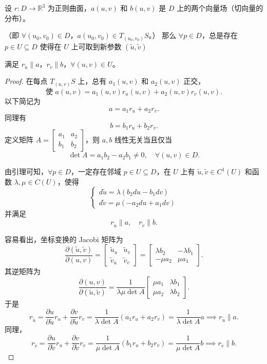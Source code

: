 \documentclass[lang=cn,10pt,thmcnt=section]{elegantbook}
\begin{document}
\begin{lemma}
    设 $r: D \rightarrow \mathbb{R}^3$ 为正则曲面，\(a(u,v)\) 和 \(b(u,v)\) 是 \(D\) 上的两个向量场（切向量的分布）。

（即 \(\forall (u_0,v_0) \in D\)，\(a(u_0,v_0) \in T_{(u_0,v_0)}S\)。）
那么 \(\forall p \in D\)，总是存在 \(p \in U \subseteq D\) 使得在 \(U\) 上可取到新参数 \((\widetilde{u}, \widetilde{v})\) 

满足 \(r_{\widetilde{u}} \parallel a\)，\(r_{\widetilde{v}} \parallel b\)，\(\forall (u,v) \in U\)。
\end{lemma}

\begin{proof}
    在每点 \( T_{(u,v)}S \) 上，总有 \( a_1(u,v) \) 和 \( a_2(u,v) \) 正交，
\[
\text{使 } a(u,v) = a_1(u,v) r_u(u,v) + a_2(u,v) r_v(u,v).
\]
以下简记为
\[
a = a_1 r_u + a_2 r_v.
\]
同理有
\[
b = b_1 r_u + b_2 r_v.
\]
定义矩阵 \( A = \begin{bmatrix} a_1 & a_2 \\ b_1 & b_2 \end{bmatrix} \)，则 \( a, b \) 线性无关当且仅当
\[
\det A = a_1 b_2 - a_2 b_1 \neq 0, \quad \forall (u,v) \in D.
\]

由引理可知，\(\forall p \in D\)，一定存在邻域 \( p \in U \subseteq D \)，在 \( U \) 上有 \(\widetilde{u}, \widetilde{v} \in C^1(U)\) 和函数 \(\lambda, \mu \in C(U)\)，使得
\[
\begin{cases}
d\widetilde{u} = \lambda (b_2 du - b_1 dv) \\
d\widetilde{v} = \mu (-a_2 du + a_1 dv)
\end{cases}
\]
并满足
\[
r_{\widetilde{u}} \parallel a, \quad r_{\widetilde{v}} \parallel b.
\]

容易看出，坐标变换的 Jacobi 矩阵为
\[
\frac{\partial (\widetilde{u}, \widetilde{v})}{\partial (u,v)} = \begin{bmatrix} \widetilde{u}_u & \widetilde{u}_v \\ \widetilde{v}_u & \widetilde{v}_v \end{bmatrix} = \begin{bmatrix} \lambda b_2 & -\lambda b_1 \\ -\mu a_2 & \mu a_1 \end{bmatrix}.
\]
其逆矩阵为
\[
\frac{\partial (u,v)}{\partial (\widetilde{u}, \widetilde{v})} = \frac{1}{\lambda \mu \det A} \begin{bmatrix} \mu a_1 & \lambda b_1 \\ \mu a_2 & \lambda b_2 \end{bmatrix}.
\]
于是
\[
r_{\widetilde{u}} = \frac{\partial u}{\partial \widetilde{u}} r_u + \frac{\partial v}{\partial \widetilde{u}} r_v = \frac{1}{\lambda \det A} (a_1 r_u + a_2 r_v) = \frac{1}{\lambda \det A} a \implies r_{\widetilde{u}} \parallel a.
\]
同理，
\[
r_{\widetilde{v}} = \frac{\partial u}{\partial \widetilde{v}} r_u + \frac{\partial v}{\partial \widetilde{v}} r_v = \frac{1}{\mu \det A} (b_1 r_u + b_2 r_v) = \frac{1}{\mu \det A} b \implies r_{\widetilde{v}} \parallel b.
\]
\end{proof}
\end{document}

